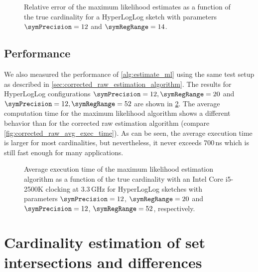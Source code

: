 \documentclass[a4paper]{scrartcl}
\begin{document}
\begin{figure}
\centering

\caption{Relative error of the maximum likelihood estimates as a function of the true cardinality for a HyperLogLog sketch with parameters $\symPrecision = 12$ and $\symRegRange=14$.}
\label{fig:max_likelihood_estimation_error_12_14}
\end{figure}

\subsection{Performance}
We also measured the performance of \cref{alg:estimate_ml} using the same test setup as described in \cref{sec:corrected_raw_estimation_algorithm}. The results for HyperLogLog configurations $\symPrecision=12, \symRegRange=20$ and $\symPrecision=12, \symRegRange=52$ are shown in \cref{fig:avg_exec_time}. The average computation time for the maximum likelihood algorithm shows a different behavior than for the corrected raw estimation algorithm (compare \cref{fig:corrected_raw_avg_exec_time}). As can be seen, the average execution time is larger for most cardinalities, but nevertheless, it never exceeds 700\,ns which is still fast enough for many applications.

\begin{figure}
\centering

\caption{Average execution time of the maximum likelihood estimation algorithm as a function of the true cardinality with an Intel Core i5-2500K clocking at 3.3\,GHz for HyperLogLog sketches with parameters $\symPrecision=12$, $\symRegRange=20$ and $\symPrecision=12$, $\symRegRange=52$, respectively.}
\label{fig:avg_exec_time}
\end{figure}

\section{Cardinality estimation of set intersections and differences}
\end{document}
